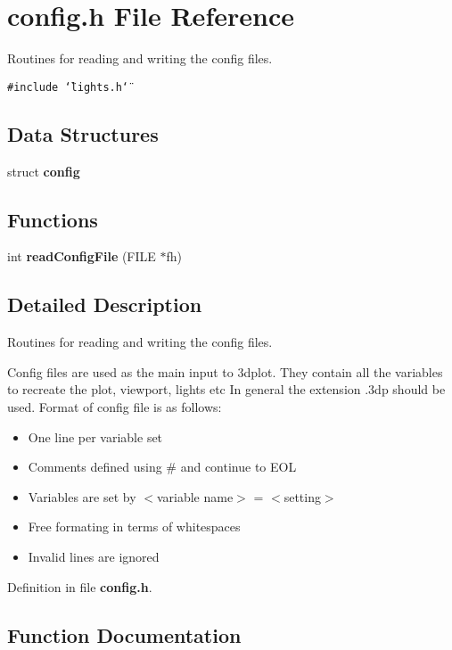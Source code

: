 \section{config.h File Reference}
\label{config_8h}
Routines for reading and writing the config files.  


{\tt \#include \char`\"{}lights.h\char`\"{}}\par
\subsection*{Data Structures}
\begin{CompactItemize}
\item 
struct {\bf config}
\end{CompactItemize}
\subsection*{Functions}
\begin{CompactItemize}
\item 
int {\bf read\-Config\-File} (FILE $\ast$fh)
\end{CompactItemize}


\subsection{Detailed Description}
Routines for reading and writing the config files. 

Config files are used as the main input to 3dplot. They contain all the variables to recreate the plot, viewport, lights etc In general the extension .3dp should be used. Format of config file is as follows:\begin{itemize}
\item One line per variable set\item Comments defined using \# and continue to EOL\item Variables are set by $<$variable name$>$ = $<$setting$>$\item Free formating in terms of whitespaces\item Invalid lines are ignored\end{itemize}


Definition in file {\bf config.h}.

\subsection{Function Documentation}
